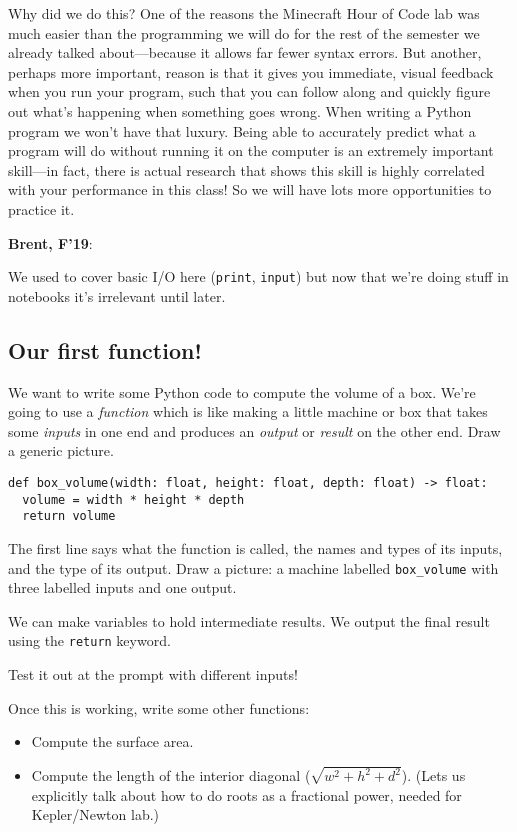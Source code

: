 \documentclass{article}
\newenvironment{reflect}[1]
{
  \noindent
  \begin{lrbox}{\reflectbox}
    \begin{minipage}[t]{\textwidth}
      \textbf{#1}:
}{
    \end{minipage}
  \end{lrbox}
  \fbox{\usebox{\reflectbox}}
}
\begin{document}
Why did we do this?  One of the reasons the Minecraft Hour of Code lab
was much easier than the programming we will do for the rest of the
semester we already talked about---because it allows far fewer syntax
errors.  But another, perhaps more important, reason is that it gives
you immediate, visual feedback when you run your program, such that
you can follow along and quickly figure out what's happening when
something goes wrong.  When writing a Python program we won't have
that luxury.  Being able to accurately predict what a program will do
without running it on the computer is an extremely important
skill---in fact, there is actual research that shows this skill is
highly correlated with your performance in this class!  So we will
have lots more opportunities to practice it.

\begin{reflect}{Brent, F'19}
  We used to cover basic I/O here (\texttt{print}, \texttt{input}) but
  now that we're doing stuff in notebooks it's irrelevant until later.
\end{reflect}

\subsection*{Our first function!}

We want to write some Python code to compute the volume of a box.
We're going to use a \emph{function} which is like making a little
machine or box that takes some \emph{inputs} in one end and produces
an \emph{output} or \emph{result} on the other end.  Draw a generic
picture.

\begin{verbatim}
def box_volume(width: float, height: float, depth: float) -> float:
  volume = width * height * depth
  return volume
\end{verbatim}

The first line says what the function is called, the names and types
of its inputs, and the type of its output.  Draw a picture: a machine
labelled \verb|box_volume| with three labelled inputs and one
output.

We can make variables to hold intermediate results.  We output the
final result using the \verb|return| keyword.

Test it out at the prompt with different inputs!

Once this is working, write some other functions:
\begin{itemize}
\item Compute the surface area.
\item Compute the length of the interior diagonal
  ($\sqrt{w^2 + h^2 + d^2}$).  (Lets us explicitly talk about how to do
  roots as a fractional power, needed for Kepler/Newton lab.)
\end{itemize}
\end{document}
